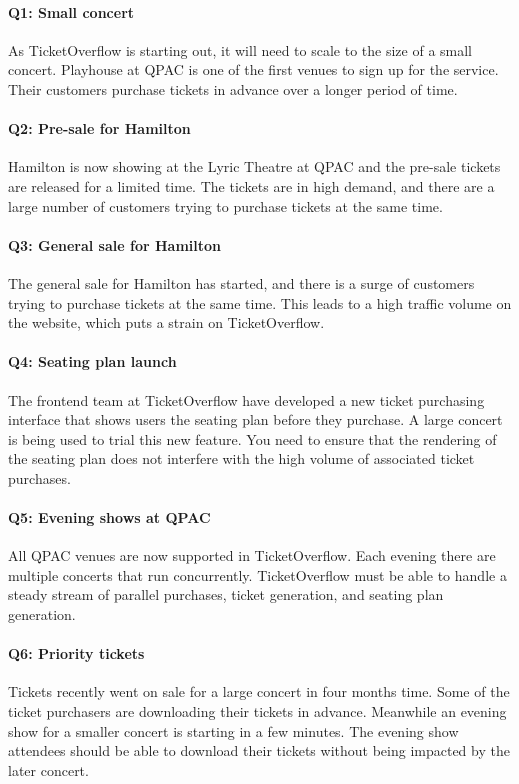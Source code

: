 \documentclass{csse4400}
\begin{document}
\paragraph{Q1: Small concert}
As TicketOverflow is starting out,
it will need to scale to the size of a small concert.
Playhouse at QPAC is one of the first venues to sign up for the service.
Their customers purchase tickets in advance over a longer period of time.

\paragraph{Q2: Pre-sale for Hamilton}
Hamilton is now showing at the Lyric Theatre at QPAC and the pre-sale tickets are released for a limited time.
The tickets are in high demand, and there are a large number of customers trying to purchase tickets at the same time.

\paragraph{Q3: General sale for Hamilton}
The general sale for Hamilton has started, and there is a surge of customers trying to purchase tickets at the same time.
This leads to a high traffic volume on the website, which puts a strain on TicketOverflow.

\paragraph{Q4: Seating plan launch}
The frontend team at TicketOverflow have developed a new ticket purchasing interface that shows users the seating plan before they purchase.
A large concert is being used to trial this new feature.
You need to ensure that the rendering of the seating plan does not interfere with the high volume of associated ticket purchases.

\paragraph{Q5: Evening shows at QPAC}
All QPAC venues are now supported in TicketOverflow.
Each evening there are multiple concerts that run concurrently.
TicketOverflow must be able to handle a steady stream of parallel purchases, ticket generation, and seating plan generation.

\paragraph{Q6: Priority tickets}
Tickets recently went on sale for a large concert in four months time.
Some of the ticket purchasers are downloading their tickets in advance.
Meanwhile an evening show for a smaller concert is starting in a few minutes.
The evening show attendees should be able to download their tickets without being impacted by the later concert.
\end{document}
